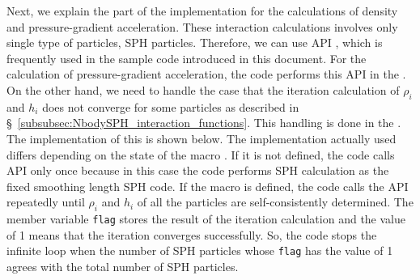 Next, we explain the part of the implementation for the calculations of density and pressure-gradient acceleration. These interaction calculations involves only single type of particles, SPH particles. Therefore, we can use API , which is frequently used in the sample code introduced in this document. For the calculation of pressure-gradient acceleration, the code performs this API in the \procedure \mainFuncName. On the other hand, we need to handle the case that the iteration calculation of $\rho_{i}$ and $h_{i}$ does not converge for some particles as described in \S~\ref{subsubsec:NbodySPH_interaction_functions}. This handling is done in the \procedure {}. The implementation of this \procedure is shown below. The implementation actually used differs depending on the state of the macro . If it is not defined, the code calls API  only once because in this case the code performs SPH calculation as the fixed smoothing length SPH code. If the macro is defined, the code calls the API repeatedly until $\rho_{i}$ and $h_{i}$ of all the particles are self-consistently determined. The member variable \texttt{flag} stores the result of the iteration calculation and the value of 1 means that the iteration converges successfully. So, the code stops the infinite  loop when the number of SPH particles whose \texttt{flag} has the value of 1 agrees with the total number of SPH particles.


